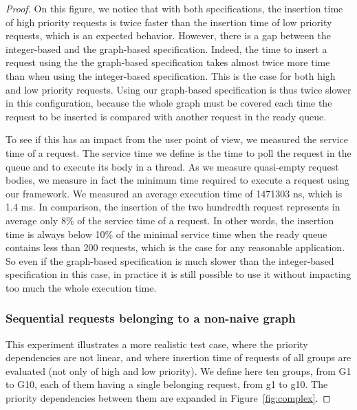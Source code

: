 \documentclass[11pt]{report}
\begin{document}
\begin{proof}
On this figure, we notice that with both specifications, the insertion time of high priority requests is twice faster than the insertion time of low priority requests, which is an expected behavior. However, there is a gap between the integer-based and the graph-based specification. Indeed, the time to insert a request using the the graph-based specification takes almost twice more time than when using the integer-based specification. This is the case for both high and low priority requests. Using our graph-based specification is thus twice slower in this configuration, because the whole graph must be covered each time the request to be inserted is compared with another request in the ready queue. 

To see if this has an impact from the user point of view, we measured the service time of a request. The service time we define is the time to poll the request in the queue and to execute its body in a thread. As we measure quasi-empty request bodies, we measure in fact the minimum time required to execute a request using our framework.
We measured an average execution time of 1471303 ns, which is 1.4 ms. In comparison, the insertion of the two hundredth request represents in average only 8\% of the service time of a request. In other words, the insertion time is always below 10\% of the minimal service time when the ready queue contains less than 200 requests, which is the case for any reasonable application. So even if the graph-based specification is much slower than the integer-based specification in this case, in practice it is still possible to use it without impacting too much the whole execution time.

\subsubsection{Sequential requests belonging to a non-naive graph}
This experiment illustrates a more realistic test case, where the priority dependencies are not linear, and where insertion time of requests of all groups are evaluated (not only of high and low priority). We define here ten groups, from G1 to G10, each of them having a single belonging request, from g1 to g10. The priority dependencies between them are expanded in Figure~\ref{fig:complex}.


\end{proof}
\end{document}
